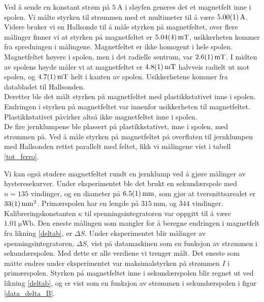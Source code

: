 \documentclass[%
 reprint,
 amsmath,amssymb,
 aps,
 norsk,
]{revtex4-1}
\begin{document}
Ved å sende en konstant strøm på $\SI{5}{\ampere}$ i sløyfen generes det et magnetfelt inne i spolen. Vi målte styrken til strømmen med et multimeter til å være $\SI{5.00\pm0.01}{\ampere}$. Videre bruker vi en Hallsonde til å måle styrken på magnetfeltet, over flere målinger finner vi at styrken på magnetfeltet er $\SI{5.04\pm0.04}{\milli\tesla}$, usikkerheten kommer fra spredningen i målingene. Magnetfeltet er ikke homogent i hele spolen. Magnetfeltet høyere i spolen, men i det radielle sentrum, var $\SI{2.6\pm0.1}{\milli\tesla}$. I midten av spolens høyde måler vi at magnetfeltet er $\SI{4.8\pm0.1}{\milli\tesla}$ halvveis radielt ut mot spolen, og $\SI{4.7\pm0.1}{\milli\tesla}$ helt i kanten av spolen. Usikkerhetene kommer fra databladet til Hallsonden.\\
Deretter ble det målt styrken på magnetfeltet med plastikkstativet inne i spolen. Endringen i styrken på magnetfeltet var innenfor usikkerheten til magnetfeltet. Plastikkstativet påvirker altså ikke magnetfeltet inne i spolen. \\
De fire jernklumpene ble plassert på plastikkstativet, inne i spolen, med strømmen på. Ved å måle styrken på magnetfeltet på overflaten til jernklumpen med Hallsonden rettet parallelt med feltet, fikk vi målingene vist i tabell \vref{tot_ferro}.\par
Vi kan også studere magnetfeltet rundt en jernklump ved å gjøre målinger av hysteresekurver. Under eksperimentet ble det brukt en sekundærspole med $n=135$ vindinger, og en diameter på $\SI{6.5\pm0.1}{\milli\meter}$, som gjør at tversnittsarealet er $\SI{33\pm1}{\milli\meter^2}$. Primærspolen har en lengde på $\SI{315}{\milli\meter}$, og $344$ vindinger. Kalibreringskonstanten $\kappa$ til spenningsintegratoren var oppgitt til å være $\SI{1.01}{\micro\weber}$. Den eneste målingen som mangler for å beregne endringen i magnetfelt fra likning \eqref{deltab}, er $\Delta S$.
Under eksperimentet blir målinger av spenningsintegratoren, $\Delta S$, vist på datamaskinen som en funksjon av strømmen i sekundærspolen. Med dette er alle verdiene vi trenger målt. Det eneste som måtte endres under eksperimentet var maksimalstyrken på strømmen $I$ i primærspolen. Styrken på magnetfeltet inne i sekundærspolen blir regnet ut ved likning \eqref{deltab}, og er vist som en funksjon av strømmen i sekundærspolen i figur \vref{data_delta_B}.
\end{document}
